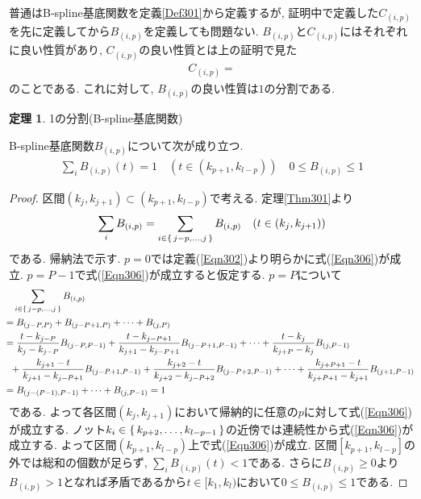 \documentclass{jsarticle}
\theoremstyle{definition}%
\newtheorem{thm}{定理}
\begin{document}
普通はB-spline基底関数を定義\ref{Def301}から定義するが, 証明中で定義した$C_{(i,p)}$を先に定義してから$B_{(i,p)}$を定義しても問題ない.
$B_{(i,p)}$と$C_{(i,p)}$にはそれぞれに良い性質があり, $C_{(i,p)}$の良い性質とは上の証明で見た
\begin{align}
    C_{(i,p)}=
\end{align}
のことである.
これに対して, $B_{(i,p)}$の良い性質は$1$の分割である.
\begin{screen}
	\begin{thm}
		\label{Thm306}
		1の分割(B-spline基底関数)

        B-spline基底関数$B_{(i,p)}$について次が成り立つ.
		\begin{align}
			\label{Eqn306}
			\sum_i B_{(i,p)}(t)= 1\quad (t\in(k_{p+1}, k_{l-p})) \quad 0\leq B_{(i,p)}\leq 1
		\end{align}
	\end{thm}
\end{screen}
\begin{proof}
	区間$(k_j,k_{j+1})\subset(k_{p+1},k_{l-p})$で考える.
	定理\ref{Thm301}より
	\begin{align}
		\sum_iB_{(i,p)}=\sum_{i\in\set{j-p,\dots,j}}B_{(i,p)}\quad (t\in(k_j,k_{j+1}))
	\end{align}
	である.
	帰納法で示す.
	$p=0$では定義(\ref{Eqn302})より明らかに式(\ref{Eqn306})が成立.
	$p=P-1$で式(\ref{Eqn306})が成立すると仮定する.
	$p=P$について
	\begin{align}
		\hspace{-0.78em}
		\begin{aligned}
			&\quad \sum_{i\in\set{j-p,\dots,j}}B_{(i,p)} \\
			&=B_{(j-P,P)}+B_{(j-P+1,P)}+\dots +B_{(j,P)} \\
			&=\frac{t-k_{j-P}}{k_{j}-k_{j-P}}B_{(j-P,P-1)}+\frac{t-k_{j-P+1}}{k_{j+1}-k_{j-P+1}}B_{(j-P+1,P-1)}+\dots+\frac{t-k_{j}}{k_{j+P}-k_{j}}B_{(j,P-1)} \\
			&\ \ +\frac{k_{j+1}-t}{k_{j+1}-k_{j-P+1}}B_{(j-P+1,P-1)}+\frac{k_{j+2}-t}{k_{j+2}-k_{j-P+2}}B_{(j-P+2,P-1)}+\dots+\frac{k_{j+P+1}-t}{k_{j+P+1}-k_{j+1}}B_{(j+1,P-1)}\\
			&=B_{(j-(P-1),P-1)}+\dots+B_{(j,P-1)}
			=1
		\end{aligned}
	\end{align}
	である.
	よって各区間$(k_j,k_{j+1})$において帰納的に任意の$p$に対して式(\ref{Eqn306})が成立する.
	ノット$k_{i}\in\set{k_{p+2},\dots,k_{l-p-1}}$の近傍では連続性から式(\ref{Eqn306})が成立する.
	よって区間$(k_{p+1}, k_{l-p})$上で式(\ref{Eqn306})が成立.
	区間$[k_{p+1},k_{l-p}]$の外では総和の個数が足らず, $\sum\limits_iB_{(i,p)}(t)<1$である.
	さらに$B_{(i,p)}\geq 0$より$B_{(i,p)}>1$となれば矛盾であるから$t\in[k_1, k_l)$において$0\leq B_{(i,p)}\leq 1$である.
\end{proof}
\end{document}
